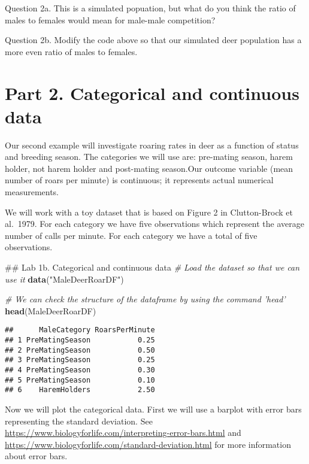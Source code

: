 \documentclass[]{book}
\newenvironment{Shaded}{\begin{snugshade}}{\end{snugshade}}
\newcommand{\CommentTok}[1]{\textcolor[rgb]{0.56,0.35,0.01}{\textit{#1}}}
\newcommand{\KeywordTok}[1]{\textcolor[rgb]{0.13,0.29,0.53}{\textbf{#1}}}
\newcommand{\NormalTok}[1]{#1}
\newcommand{\StringTok}[1]{\textcolor[rgb]{0.31,0.60,0.02}{#1}}
\begin{document}
Question 2a. This is a simulated popuation, but what do you think the ratio of males to females would mean for male-male competition?

Question 2b. Modify the code above so that our simulated deer population has a more even ratio of males to females.

\hypertarget{part-2.-categorical-and-continuous-data}{%
\section*{Part 2. Categorical and continuous data}\label{part-2.-categorical-and-continuous-data}}

Our second example will investigate roaring rates in deer as a function of status and breeding season. The categories we will use are: pre-mating season, harem holder, not harem holder and post-mating season.Our outcome variable (mean number of roars per minute) is continuous; it represents actual numerical measurements.

We will work with a toy dataset that is based on Figure 2 in Clutton-Brock et al.~1979. For each category we have five observations which represent the average number of calls per minute. For each category we have a total of five observations.

\begin{Shaded}
\begin{Highlighting}[]
\NormalTok{## Lab 1b. Categorical and continuous data}
\CommentTok{# Load the dataset so that we can use it }
\KeywordTok{data}\NormalTok{(}\StringTok{"MaleDeerRoarDF"}\NormalTok{)}

\CommentTok{# We can check the structure of the dataframe by using the command 'head'}
\KeywordTok{head}\NormalTok{(MaleDeerRoarDF)}
\end{Highlighting}
\end{Shaded}

\begin{verbatim}
##      MaleCategory RoarsPerMinute
## 1 PreMatingSeason           0.25
## 2 PreMatingSeason           0.50
## 3 PreMatingSeason           0.25
## 4 PreMatingSeason           0.30
## 5 PreMatingSeason           0.10
## 6    HaremHolders           2.50
\end{verbatim}

Now we will plot the categorical data. First we will use a barplot with error bars representing the standard deviation. See \url{https://www.biologyforlife.com/interpreting-error-bars.html} and \url{https://www.biologyforlife.com/standard-deviation.html} for more information about error bars.
\end{document}
